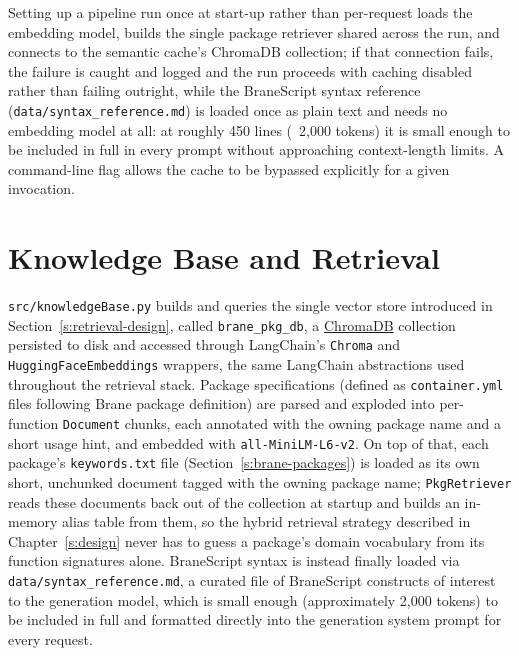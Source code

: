 Setting up a pipeline run once at start-up rather than per-request loads
the embedding model, builds the single package retriever shared across the
run, and connects to the semantic cache's ChromaDB collection; if that
connection fails, the failure is caught and logged and the run proceeds
with caching disabled rather than failing outright, while the BraneScript
syntax reference (\texttt{data/syntax\_reference.md}) is loaded once as plain text and needs no embedding model
at all: at roughly 450 lines (~2,000 tokens) it is small enough to be
included in full in every prompt without approaching context-length limits. A command-line flag allows the cache to be bypassed explicitly for
a given invocation.

\section{Knowledge Base and Retrieval}\label{s:kb-impl}

\texttt{src/knowledgeBase.py} builds and queries the single vector store
introduced in Section~\ref{s:retrieval-design}, called \texttt{brane\_pkg\_db}, a
\href{https://www.trychroma.com/}{ChromaDB} collection persisted to disk and
accessed through LangChain's \texttt{Chroma} and
\texttt{HuggingFaceEmbeddings} wrappers, the same LangChain abstractions used
throughout the retrieval stack. Package specifications
(defined as \texttt{container.yml} files following Brane package definition) 
are parsed and exploded into per-function
\texttt{Document} chunks, each annotated with the owning package name and a
short usage hint, and embedded with \texttt{all-MiniLM-L6-v2}. 
On top of that, each package's \texttt{keywords.txt} file (Section~\ref{s:brane-packages}) is
loaded as its own short, unchunked document tagged with the owning package
name; \texttt{PkgRetriever} reads these documents back out of the collection
at startup and builds an in-memory alias table from them, so the hybrid
retrieval strategy described in Chapter~\ref{s:design} never has to guess a
package's domain vocabulary from its function signatures alone. BraneScript syntax is
instead finally loaded via \texttt{data/syntax\_reference.md}, a curated file of BraneScript constructs
of interest to the generation model, which is small enough  (approximately 2,000 tokens) to be included in full and
formatted directly into the generation system prompt for every request.

